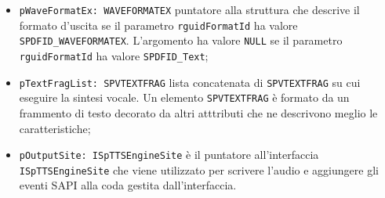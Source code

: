 \begin{itemize}
\begin{itemize}
			\item \texttt{pWaveFormatEx: WAVEFORMATEX} puntatore alla struttura che descrive il formato d'uscita se il parametro \texttt{rguidFormatId} ha valore \texttt{SPDFID\_WAVEFORMATEX}. L'argomento ha valore \texttt{NULL} se il parametro \texttt{rguidFormatId} ha valore \texttt{SPDFID\_Text};
			\item \texttt{pTextFragList: SPVTEXTFRAG} lista concatenata di \texttt{SPVTEXTFRAG} su cui eseguire la sintesi vocale. Un elemento \texttt{SPVTEXTFRAG} è formato da un frammento di testo decorato da altri atttributi che ne descrivono meglio le caratteristiche;
			\item \texttt{pOutputSite: ISpTTSEngineSite} è il puntatore all'interfaccia \texttt{ISpTTSEngineSite} che viene utilizzato per scrivere l'audio e aggiungere gli eventi SAPI alla coda gestita dall'interfaccia.
		\end{itemize}  
	\end{itemize}

